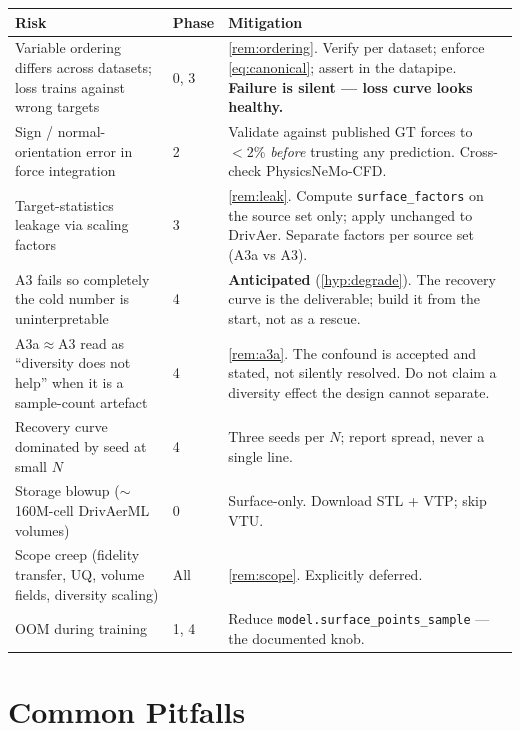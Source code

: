 \documentclass[10pt,a4paper]{article}
\theoremstyle{definition}
\begin{document}
\begin{center}\small
\begin{tabular}{@{}p{4.0cm}p{1.4cm}p{9.6cm}@{}}
\toprule
\textbf{Risk} & \textbf{Phase} & \textbf{Mitigation} \\
\midrule
Variable ordering differs across datasets; loss trains against wrong targets
  & 0, 3
  & \cref{rem:ordering}. Verify per dataset; enforce \cref{eq:canonical}; assert in
    the datapipe. \textbf{Failure is silent --- loss curve looks healthy.} \\[0.3em]
Sign / normal-orientation error in force integration
  & 2
  & Validate against published GT forces to $<2\%$ \emph{before} trusting any
    prediction. Cross-check PhysicsNeMo-CFD. \\[0.3em]
Target-statistics leakage via scaling factors
  & 3
  & \cref{rem:leak}. Compute \texttt{surface\_factors} on the source set only; apply
    unchanged to DrivAer. Separate factors per source set (A3a vs A3). \\[0.3em]
A3 fails so completely the cold number is uninterpretable
  & 4
  & \textbf{Anticipated} (\cref{hyp:degrade}). The recovery curve is the deliverable;
    build it from the start, not as a rescue. \\[0.3em]
A3a$\approx$A3 read as ``diversity does not help'' when it is a sample-count artefact
  & 4
  & \cref{rem:a3a}. The confound is accepted and stated, not silently resolved. Do not
    claim a diversity effect the design cannot separate. \\[0.3em]
Recovery curve dominated by seed at small $N$
  & 4
  & Three seeds per $N$; report spread, never a single line. \\[0.3em]
Storage blowup ($\sim$160M-cell DrivAerML volumes)
  & 0
  & Surface-only. Download STL + VTP; skip VTU. \\[0.3em]
Scope creep (fidelity transfer, UQ, volume fields, diversity scaling)
  & All
  & \cref{rem:scope}. Explicitly deferred. \\[0.3em]
OOM during training
  & 1, 4
  & Reduce \texttt{model.surface\_points\_sample} --- the documented knob. \\
\bottomrule
\end{tabular}
\end{center}

\section{Common Pitfalls}
\end{document}
